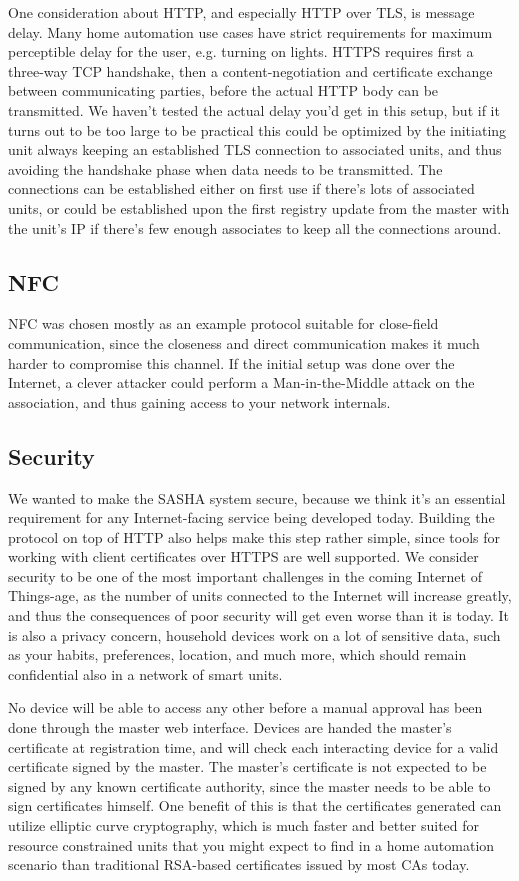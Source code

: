 One consideration about HTTP, and especially HTTP over TLS, is message delay. Many home automation use cases have strict requirements for maximum perceptible delay for the user, e.g. turning on lights. HTTPS requires first a three-way TCP handshake, then a content-negotiation and certificate exchange between communicating parties, before the actual HTTP body can be transmitted. We haven't tested the actual delay you'd get in this setup, but if it turns out to be too large to be practical this could be optimized by the initiating unit always keeping an established TLS connection to associated units, and thus avoiding the handshake phase when data needs to be transmitted. The connections can be established either on first use if there's lots of associated units, or could be established upon the first registry update from the master with the unit's IP if there's few enough associates to keep all the connections around.

\subsection{NFC}
NFC was chosen mostly as an example protocol suitable for close-field communication, since the closeness and direct communication makes it much harder to compromise this channel. If the initial setup was done over the Internet, a clever attacker could perform a Man-in-the-Middle attack on the association, and thus gaining access to your network internals.

\subsection{Security}
We wanted to make the SASHA system secure, because we think it's an essential requirement for any Internet-facing service being developed today. Building the protocol on top of HTTP also helps make this step rather simple, since tools for working with client certificates over HTTPS are well supported. We consider security to be one of the most important challenges in the coming Internet of Things-age, as the number of units connected to the Internet will increase greatly, and thus the consequences of poor security will get even worse than it is today. It is also a privacy concern, household devices work on a lot of sensitive data, such as your habits, preferences, location, and much more, which should remain confidential also in a network of smart units.

No device will be able to access any other before a manual approval has been done through the master web interface. Devices are handed the master's certificate at registration time, and will check each interacting device for a valid certificate signed by the master. The master's certificate is not expected to be signed by any known certificate authority, since the master needs to be able to sign certificates himself. One benefit of this is that the certificates generated can utilize elliptic curve cryptography, which is much faster and better suited for resource constrained units that you might expect to find in a home automation scenario than traditional RSA-based certificates issued by most CAs today.


